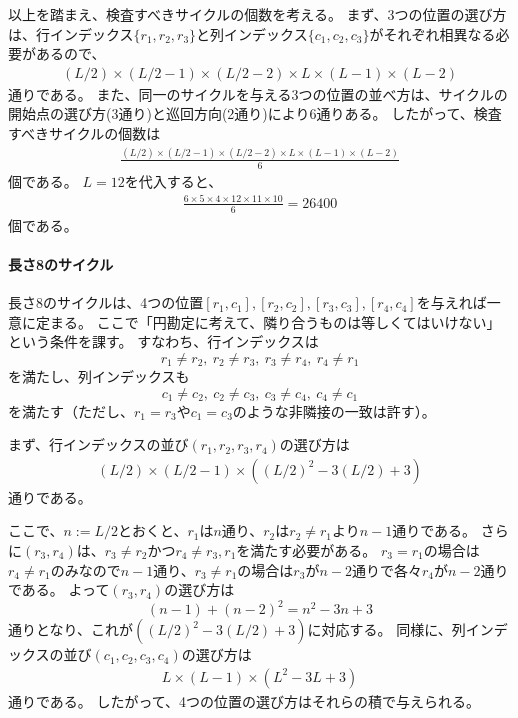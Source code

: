 \documentclass[a4paper,11pt,dvipdfmx]{jsarticle}
\theoremstyle{definition}
\begin{document}
以上を踏まえ、検査すべきサイクルの個数を考える。
まず、3つの位置の選び方は、行インデックス$\{r_1,r_2,r_3\}$と列インデックス$\{c_1,c_2,c_3\}$がそれぞれ相異なる必要があるので、
\begin{align}
  (L/2)\times (L/2-1)\times (L/2-2)\times L\times (L-1)\times (L-2)
\end{align}
通りである。
また、同一のサイクルを与える3つの位置の並べ方は、サイクルの開始点の選び方(3通り)と巡回方向(2通り)により$6$通りある。
したがって、検査すべきサイクルの個数は
\begin{align}
  \frac{(L/2)\times (L/2-1)\times (L/2-2)\times L\times (L-1)\times (L-2)}{6}\label{eq:012805}
\end{align}
個である。
$L=12$を代入すると、
\begin{align}
  \frac{6\times 5\times 4\times 12\times 11\times 10}{6} = 26400
\end{align}
個である。

\paragraph{長さ8のサイクル}
長さ8のサイクルは、4つの位置$[r_1,c_1],[r_2,c_2],[r_3,c_3],[r_4,c_4]$を与えれば一意に定まる。
ここで「円勘定に考えて、隣り合うものは等しくてはいけない」という条件を課す。
すなわち、行インデックスは
\[
  r_1\neq r_2,\ r_2\neq r_3,\ r_3\neq r_4,\ r_4\neq r_1
\]
を満たし、列インデックスも
\[
  c_1\neq c_2,\ c_2\neq c_3,\ c_3\neq c_4,\ c_4\neq c_1
\]
を満たす（ただし、$r_1=r_3$や$c_1=c_3$のような非隣接の一致は許す）。

まず、行インデックスの並び$(r_1,r_2,r_3,r_4)$の選び方は
\begin{align}
  (L/2)\times (L/2-1)\times \left((L/2)^2-3(L/2)+3\right)
\end{align}
通りである。  

ここで、$n:=L/2$とおくと、$r_1$は$n$通り、$r_2$は$r_2\neq r_1$より$n-1$通りである。
さらに$(r_3,r_4)$は、$r_3\neq r_2$かつ$r_4\neq r_3,r_1$を満たす必要がある。
$r_3=r_1$の場合は$r_4\neq r_1$のみなので$n-1$通り、$r_3\neq r_1$の場合は$r_3$が$n-2$通りで各々$r_4$が$n-2$通りである。
よって$(r_3,r_4)$の選び方は
\[
  (n-1)+(n-2)^2 = n^2-3n+3
\]
通りとなり、これが$\left((L/2)^2-3(L/2)+3\right)$に対応する。
同様に、列インデックスの並び$(c_1,c_2,c_3,c_4)$の選び方は
\begin{align}
  L\times (L-1)\times \left(L^2-3L+3\right)
\end{align}
通りである。
したがって、4つの位置の選び方はそれらの積で与えられる。
\end{document}
